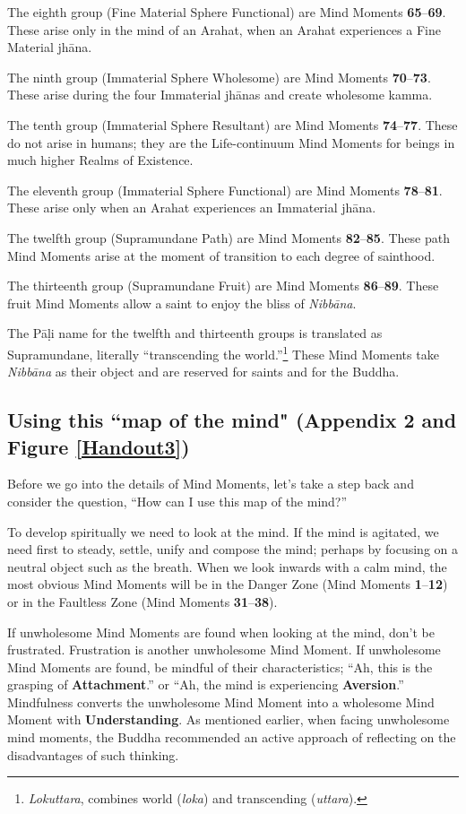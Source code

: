 The eighth group (Fine Material Sphere Functional) are Mind Moments \textbf{65}--\textbf{69}. These arise only in the mind of an Arahat, when an Arahat experiences a Fine Material jhāna.

The ninth group (Immaterial Sphere Wholesome) are Mind Moments \textbf{70}--\textbf{73}. These arise during the four Immaterial jhānas and create wholesome kamma.

The tenth group (Immaterial Sphere Resultant) are Mind Moments \textbf{74}--\textbf{77}. These do not arise in humans; they are the Life-continuum Mind Moments for beings in much higher Realms of Existence.

The eleventh group (Immaterial Sphere Functional) are Mind Moments \textbf{78}--\textbf{81}. These arise only when an Arahat experiences an Immaterial jhāna.

The twelfth group (Supramundane Path) are Mind Moments \textbf{82}--\textbf{85}. These path Mind Moments arise at the moment of transition to each degree of sainthood. 

The thirteenth group (Supramundane Fruit) are Mind Moments \textbf{86}--\textbf{89}. These fruit Mind Moments allow a saint to enjoy the bliss of \textit{Nibbāna}. 

The Pāḷi name for the twelfth and thirteenth groups is translated as Supramundane, literally “transcending the world.”\footnote{\textit{Lokuttara}, combines world (\textit{loka}) and transcending (\textit{uttara}).} These Mind Moments take \textit{Nibbāna} as their object and are reserved for saints and for the Buddha.

\subsection*{Using this ``map of the mind" (Appendix 2 and Figure \ref{Handout3})}

Before we go into the details of Mind Moments, let’s take a step back and consider the question, “How can I use this map of the mind?”

To develop spiritually we need to look at the mind. If the mind is agitated, we need first to steady, settle, unify and compose the mind; perhaps by focusing on a neutral object such as the breath. When we look inwards with a calm mind, the most obvious Mind Moments will be in the Danger Zone (Mind Moments \textbf{1}--\textbf{12}) or in the Faultless Zone (Mind Moments \textbf{31}--\textbf{38}).

If unwholesome Mind Moments are found when looking at the mind, don’t be frustrated. Frustration is another unwholesome Mind Moment. If unwholesome Mind Moments are found, be mindful of their characteristics; “Ah, this is the grasping of \textbf{Attachment}.” or “Ah, the mind is experiencing \textbf{Aversion}.” Mindfulness converts the unwholesome Mind Moment into a wholesome Mind Moment with \textbf{Understanding}. As mentioned earlier, when facing unwholesome mind moments, the Buddha recommended an active approach of reflecting on the disadvantages of such thinking.

